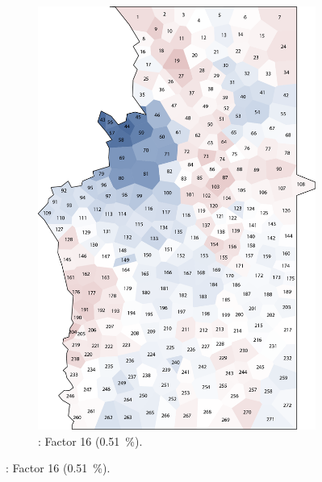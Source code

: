 \documentclass[output=paper]{LSP/langsci}
\begin{document}
\begin{figure}
\begin{subfigure}[t]{0.3\textwidth}
\includegraphics[width=\textwidth]{illustrations/pickl_fig15}
\caption{: Factor 16 (0.51~\%).}
\label{fig:15}
\end{subfigure}
\end{figure}
\end{document}
